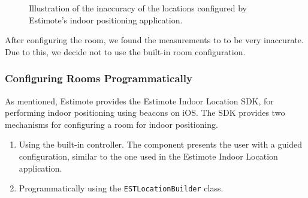 \begin{figure}[!htb]%
    \centering
    \caption{Illustration of the inaccuracy of the locations configured by Estimote's indoor positioning application.}
    \label{fig:estimote-location-configuration}
\end{figure}

After configuring the room, 
we found the measurements to to be very inaccurate.
Due to this, we decide not to use the built-in room configuration. 

\subsubsection{Configuring Rooms Programmatically}
As mentioned, Estimote provides the Estimote Indoor Location SDK, 
for performing indoor positioning using beacons on iOS. 
The SDK provides two mechanisms for configuring a room for indoor positioning.

\begin{enumerate}
\item Using the built-in controller. The component presents the user with a guided configuration, similar to the one used in the Estimote Indoor Location application.
\item Programmatically using the \texttt{ESTLocationBuilder} class.
\end{enumerate}

